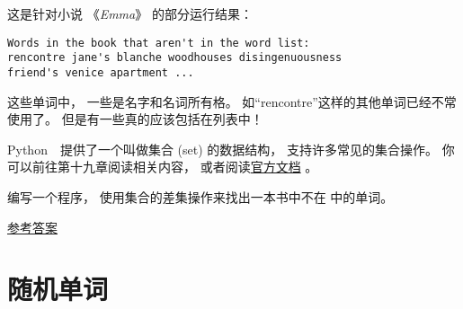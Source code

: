 
这是针对小说 《{\em Emma}》 的部分运行结果：

\begin{lstlisting}
Words in the book that aren't in the word list:
rencontre jane's blanche woodhouses disingenuousness
friend's venice apartment ...
\end{lstlisting}


这些单词中， 一些是名字和名词所有格。  如“rencontre”这样的其他单词已经不常使用了。
但是有一些真的应该包括在列表中！

\begin{exercise}

Python　提供了一个叫做集合 (set) 的数据结构， 支持许多常见的集合操作。
你可以前往第十九章阅读相关内容， 或者阅读\href{http://docs.python.org/3/library/stdtypes.html#types-set}{官方文档} 。

编写一个程序， 使用集合的差集操作来找出一本书中不在  中的单词。

\href{http://thinkpython2.com/code/analyze_book2.py}{参考答案}

\end{exercise}

\section{随机单词}
\label{randomwords}


